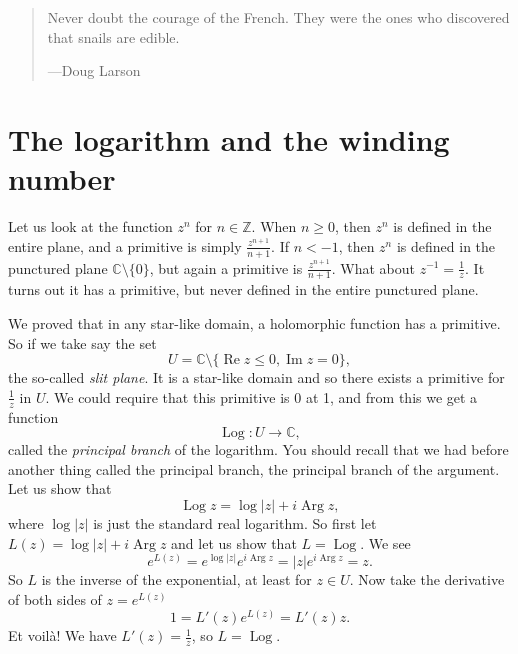\documentclass[12pt,openany]{book}
\renewcommand{\Re}{\operatorname{Re}}
\renewcommand{\Im}{\operatorname{Im}}
\newcommand{\Arg}{\operatorname{Arg}}
\newcommand{\Log}{\operatorname{Log}}
\newcommand{\sabs}[1]{\lvert {#1} \rvert}
\newcommand{\C}{{\mathbb{C}}}
\newcommand{\Z}{{\mathbb{Z}}}
\newcommand{\myindex}[1]{#1\index{#1}}
\theoremstyle{plain}
\theoremstyle{remark}
\theoremstyle{definition}
\newenvironment{myquote}{%
    \begin{quote}%
    \begingroup\itshape
}{%
    \endgroup%
    \end{quote}
}
\theoremstyle{exercise}
\theoremstyle{example}
\begin{document}
\begin{myquote}
Never doubt the courage of the French. They were the ones who discovered that snails are edible.

---Doug Larson
\end{myquote}


\section{The logarithm and the winding number}
\label{sec:log}

Let us look at the function $z^n$ for $n \in \Z$.  When $n \geq 0$, 
then $z^n$ is defined in the entire plane, and a primitive is
simply $\frac{z^{n+1}}{n+1}$.  If $n < -1$, then $z^n$ is defined
in the punctured plane $\C \setminus \{0\}$, but again
a primitive is $\frac{z^{n+1}}{n+1}$.  What about $z^{-1} =
\frac{1}{z}$.  It turns out it has a primitive, but never defined in
the entire punctured plane.

We proved that in any star-like domain, a holomorphic function has a
primitive.  So if we take say the set
\begin{equation*}
U = \C \setminus \{ \Re z \leq 0 , \Im z = 0 \},
\end{equation*}
the so-called \emph{\myindex{slit plane}}.  It is a star-like domain and
so there exists a
primitive for $\frac{1}{z}$ in $U$.
We could require that this primitive is 0 at 1,
and from this we get a function
\begin{equation*}
\operatorname{Log} \colon U \to \C ,
\end{equation*}
called the \emph{\myindex{principal branch}} of the logarithm.  You should
recall that we had before another thing called the principal branch, 
the principal branch of the argument.  Let us show that
\begin{equation*}
\Log z = \log \sabs{z} + i \Arg z ,
\end{equation*}
where $\log \sabs{z}$ is just the standard real logarithm.  So first let
$L(z) = \log \sabs{z} + i \Arg z$ and let us show that $L = \Log$.  We see
\begin{equation*}
e^{L(z)}
=
e^{\log \sabs{z}} e^{i \Arg z}
=
\sabs{z} e^{i \Arg z} = z .
\end{equation*}
So $L$ is the inverse of the exponential, at least for $z \in U$.
Now take the derivative of both sides of $z = e^{L(z)}$
\begin{equation*}
1 = L'(z) e^{L(z)} = L'(z) z .
\end{equation*}
Et voil\`a!  We have $L'(z) = \frac{1}{z}$, so $L = \Log$.
\end{document}

